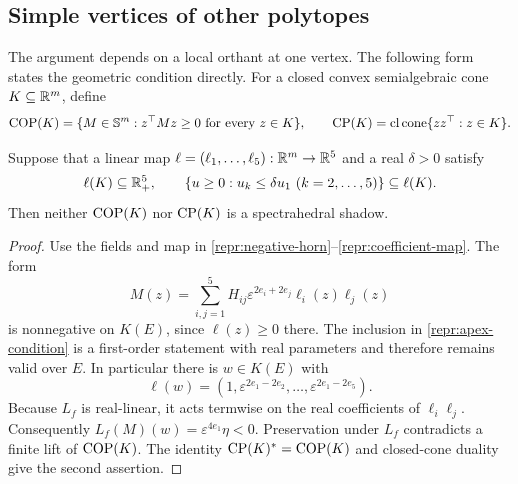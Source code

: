 \subsection{Simple vertices of other polytopes}

The argument depends on a local orthant at one vertex. The following form
states the geometric condition directly. For a closed convex semialgebraic
cone $K\subseteq\mathbb R^m$, define
\[
 \operatorname{COP}(K)=\{M\in\mathbb S^{m}:z^\top Mz\geq0\text{ for every }z\in K\},
 \qquad
 \operatorname{CP}(K)=\operatorname{cl}\operatorname{cone}\{zz^\top:z\in K\}.
\]

\begin{theorem}\label{repr:apex}
Suppose that a linear map $\ell=(\ell_1,\ldots,\ell_5):\mathbb R^m\to\mathbb R^5$
and a real $\delta>0$ satisfy
\begin{equation}\label{repr:apex-condition}
 \ell(K)\subseteq\mathbb R_+^5,
 \qquad
 \{u\geq0:u_k\leq\delta u_1\ (k=2,\ldots,5)\}\subseteq\ell(K).
\end{equation}
Then neither $\operatorname{COP}(K)$ nor $\operatorname{CP}(K)$ is a spectrahedral shadow.
\end{theorem}
\begin{proof}
Use the fields and map in \eqref{repr:negative-horn}--\eqref{repr:coefficient-map}.
The form
\[
 M(z)=\sum_{i,j=1}^5H_{ij}\varepsilon^{2e_i+2e_j}
                         \ell_i(z)\ell_j(z)
\]
is nonnegative on $K(E)$, since $\ell(z)\geq0$ there.
The inclusion in \eqref{repr:apex-condition} is a first-order statement with
real parameters and therefore remains valid over $E$. In particular there
is $w\in K(E)$ with
\[
 \ell(w)=(1,\varepsilon^{2e_1-2e_2},\ldots,
                    \varepsilon^{2e_1-2e_5}).
\]
Because $L_f$ is real-linear, it acts termwise on the real coefficients of
$\ell_i\ell_j$. Consequently
$L_f(M)(w)=\varepsilon^{4e_1}\eta<0$.
Preservation under $L_f$ contradicts a finite lift of $\operatorname{COP}(K)$.
The identity $\operatorname{CP}(K)^*=\operatorname{COP}(K)$ and closed-cone duality give the second
assertion.
\end{proof}


